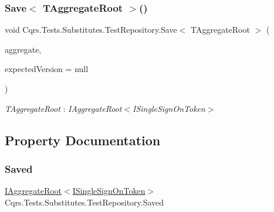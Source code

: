 \subsubsection{\texorpdfstring{Save$<$ T\+Aggregate\+Root $>$()}{Save< TAggregateRoot >()}}
{\footnotesize\ttfamily void Cqrs.\+Tests.\+Substitutes.\+Test\+Repository.\+Save$<$ T\+Aggregate\+Root $>$ (\begin{DoxyParamCaption}\item[{T\+Aggregate\+Root}]{aggregate,  }\item[{int?}]{expected\+Version = {\ttfamily null} }\end{DoxyParamCaption})}

\begin{Desc}
\item[Type Constraints]\begin{description}
\item[{\em T\+Aggregate\+Root} : {\em I\+Aggregate\+Root$<$I\+Single\+Sign\+On\+Token$>$}]\end{description}
\end{Desc}


\subsection{Property Documentation}
\mbox{\label{classCqrs_1_1Tests_1_1Substitutes_1_1TestRepository_ab0948780928642027f86a02c74d010d0_ab0948780928642027f86a02c74d010d0}} 
\subsubsection{\texorpdfstring{Saved}{Saved}}
{\footnotesize\ttfamily \hyperlink{interfaceCqrs_1_1Domain_1_1IAggregateRoot}{I\+Aggregate\+Root}$<$\hyperlink{interfaceCqrs_1_1Authentication_1_1ISingleSignOnToken}{I\+Single\+Sign\+On\+Token}$>$ Cqrs.\+Tests.\+Substitutes.\+Test\+Repository.\+Saved\hspace{0.3cm}{\ttfamily [get]}}

